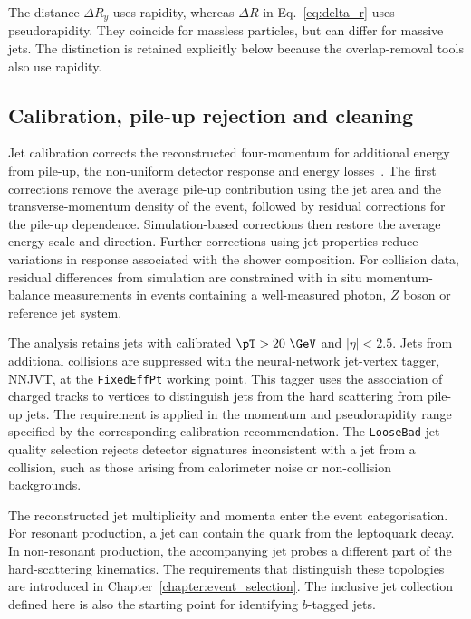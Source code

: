 The distance $\Delta R_y$ uses rapidity, whereas $\Delta R$ in Eq.~\eqref{eq:delta_r} uses pseudorapidity.
They coincide for massless particles, but can differ for massive jets.
The distinction is retained explicitly below because the overlap-removal tools also use rapidity.

\subsection{Calibration, pile-up rejection and cleaning}

Jet calibration corrects the reconstructed four-momentum for additional energy from pile-up, the non-uniform detector response and energy losses~\cite{ATLAS2021JetCalibration}.
The first corrections remove the average pile-up contribution using the jet area and the transverse-momentum density of the event, followed by residual corrections for the pile-up dependence.
Simulation-based corrections then restore the average energy scale and direction.
Further corrections using jet properties reduce variations in response associated with the shower composition.
For collision data, residual differences from simulation are constrained with in situ momentum-balance measurements in events containing a well-measured photon, $Z$ boson or reference jet system.

The analysis retains jets with calibrated $\pT>20~\GeV$ and $|\eta|<2.5$.
Jets from additional collisions are suppressed with the neural-network jet-vertex tagger, NNJVT, at the \texttt{FixedEffPt} working point.
This tagger uses the association of charged tracks to vertices to distinguish jets from the hard scattering from pile-up jets.
The requirement is applied in the momentum and pseudorapidity range specified by the corresponding calibration recommendation.
The \texttt{LooseBad} jet-quality selection rejects detector signatures inconsistent with a jet from a collision, such as those arising from calorimeter noise or non-collision backgrounds.

The reconstructed jet multiplicity and momenta enter the event categorisation.
For resonant production, a jet can contain the quark from the leptoquark decay.
In non-resonant production, the accompanying jet probes a different part of the hard-scattering kinematics.
The requirements that distinguish these topologies are introduced in Chapter~\ref{chapter:event_selection}.
The inclusive jet collection defined here is also the starting point for identifying $b$-tagged jets.


